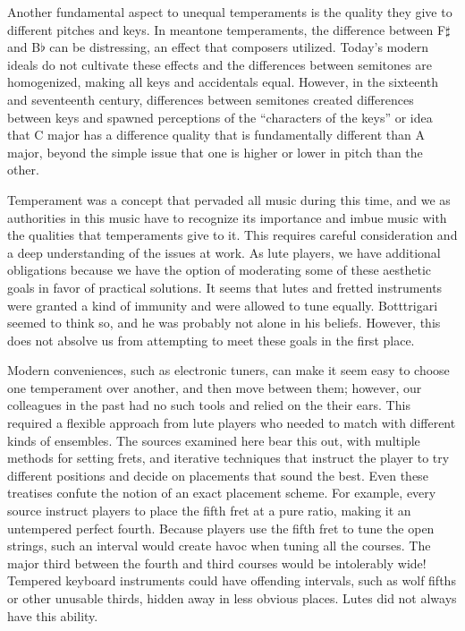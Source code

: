 Another fundamental aspect to unequal temperaments is the quality they give to different pitches and
keys.  In meantone temperaments, the difference between F$\sharp$ and B$\flat$ can be distressing,
an effect that composers utilized.  Today's modern ideals do not cultivate these effects and the
differences between semitones are homogenized, making all keys and accidentals equal.  However, in
the sixteenth and seventeenth century, differences between semitones created differences between
keys and spawned perceptions of the ``characters of the keys'' or idea that C major has a difference
quality that is fundamentally different than A major, beyond the simple issue that one is higher or
lower in pitch than the other.

Temperament was a concept that pervaded all music during this time, and we as authorities in this
music have to recognize its importance and imbue music with the qualities that temperaments give to
it.  This requires careful consideration and a deep understanding of the issues at work.  As lute
players, we have additional obligations because we have the option of moderating some of these
aesthetic goals in favor of practical solutions.  It seems that lutes and fretted instruments were
granted a kind of immunity and were allowed to tune equally.  Botttrigari seemed to think so, and he
was probably not alone in his beliefs. \autocite[19]{HB:1}  However, this does not absolve us from
attempting to meet these goals in the first place.

Modern conveniences, such as electronic tuners, can make it seem easy to choose one temperament over
another, and then move between them; however, our colleagues in the past had no such tools and
relied on the their ears.  This required a flexible approach from lute players who needed to match
with different kinds of ensembles.  The sources examined here bear this out, with multiple methods
for setting frets, and iterative techniques that instruct the player to try different positions and
decide on placements that sound the best.  Even these treatises confute the notion of an exact
placement scheme. For example, every source instruct players to place the fifth fret at a pure
ratio, making it an untempered perfect fourth.  Because players use the fifth fret to tune the open
strings, such an interval would create havoc when tuning all the courses. The major third between
the fourth and third courses would be intolerably wide!  Tempered keyboard instruments could have
offending intervals, such as wolf fifths or other unusable thirds, hidden away in less obvious
places.  Lutes did not always have this ability.

